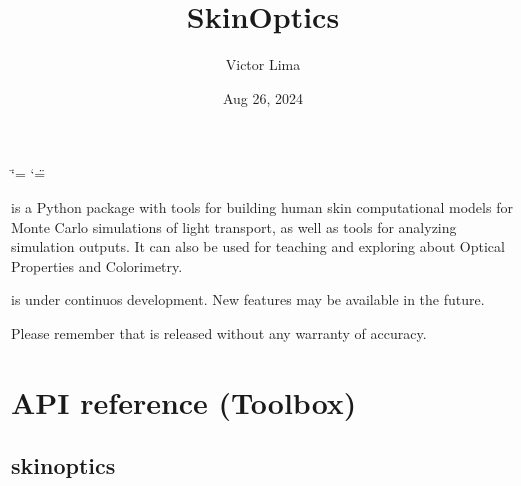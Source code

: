 \documentclass[letterpaper,10pt,english]{sphinxmanual}
\title{SkinOptics}
\date{Aug 26, 2024}
\author{Victor Lima}
\begin{document}
\ifdefined\shorthandoff
  \ifnum\catcode`\=\string=\active\shorthandoff{=}\fi
  \ifnum\catcode`\"=\active{}\fi
\fi

\pagestyle{empty}
\sphinxmaketitle
\pagestyle{plain}
\sphinxtableofcontents
\pagestyle{normal}
\label{\detokenize{index::doc}}


\sphinxAtStartPar
{} is a Python package with tools for building human skin computational models for Monte Carlo simulations of light transport, as well as tools for analyzing simulation outputs. It can also be used for teaching and exploring about Optical Properties and Colorimetry.

\sphinxAtStartPar
{} is under continuos development. New features may be available in the future.

\sphinxAtStartPar
Please remember that  is released without any warranty of accuracy.


\chapter{API reference (Toolbox)}
\label{\detokenize{index:api-reference-toolbox}}
\sphinxstepscope


\section{skinoptics}
\label{\detokenize{modules:skinoptics}}\label{\detokenize{modules::doc}}
\sphinxstepscope
\end{document}
